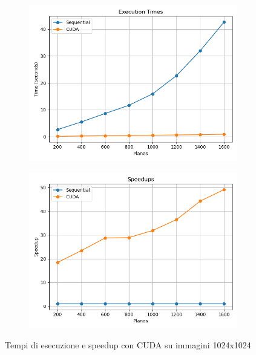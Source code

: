 \begin{figure}[H]
    \centering
    \begin{subfigure}{0.49\textwidth}
        \centering
        \includegraphics[width=\textwidth]{../results/plots/1024/cuda_times}
    \end{subfigure}
    \begin{subfigure}{0.49\textwidth}
        \centering
        \includegraphics[width=\textwidth]{../results/plots/1024/cuda_speedup}
    \end{subfigure}
    \caption{Tempi di esecuzione e speedup con CUDA su immagini 1024x1024}
    \label{fig:cuda_1024}
\end{figure}

